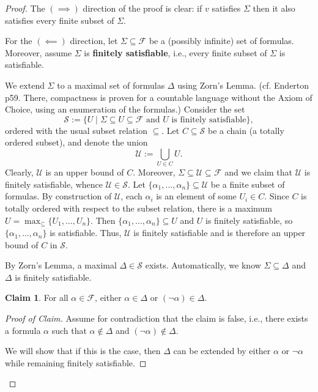 \documentclass[12pt]{article}
\theoremstyle{definition}
\newtheorem{claim}[theorem]{Claim}
\newcommand{\<}{\langle}
\renewcommand{\>}{\rangle}
\newcommand{\seq}{\subseteq}
\newcommand{\FF}{\mathcal{F}}
\renewcommand{\SS}{\mathcal{S}}
\newcommand{\UU}{\mathcal{U}}
\newcommand{\keyword}{\textbf}
\begin{document}
\begin{proof}
    The $(\implies)$ direction of the proof is clear: if $v$ satisfies $\Sigma$ then it also satisfies every finite subset of $\Sigma$.

    For the $(\impliedby)$ direction, let $\Sigma \seq \FF$ be a (possibly infinite) set of formulas.
    Moreover, assume $\Sigma$ is \keyword{finitely satisfiable}, i.e., every finite subset of $\Sigma$ is satisfiable.

    We extend $\Sigma$ to a maximal set of formulas $\Delta$ using Zorn's Lemma.
    (cf. Enderton p59. There, compactness is proven for a countable language without the Axiom of Choice, using an enumeration of the formulas.)
    Consider the set
    \[
        \SS := \{U \mid \Sigma \seq U \seq \FF \text{ and $U$ is finitely satisfiable}\},
    \]
    ordered with the usual subset relation $\seq$.
    Let $C \seq \SS$ be a chain (a totally ordered subset), and denote the union
    \[
        \UU := \bigcup_{U \in C} U.
    \]
    Clearly, $\UU$ is an upper bound of $C$.
    Moreover, $\Sigma \seq \UU \seq \FF$ and we claim that $\UU$ is finitely satisfiable, whence $\UU \in \SS$.
    Let $\{\alpha_1, \dots, \alpha_n\} \seq \UU$ be a finite subset of formulas.
    By construction of $\UU$, each $\alpha_i$ is an element of some $U_i \in C$.
    Since $C$ is totally ordered with respect to the subset relation, there is a maximum $U = \max_\seq\{U_1, \dots, U_n\}$.
    Then $\{\alpha_1, \dots, \alpha_n\} \seq U$ and $U$ is finitely satisfiable, so $\{\alpha_1, \dots, \alpha_n\}$ is satisfiable.
    Thus, $\UU$ is finitely satisfiable and is therefore an upper bound of $C$ in $\SS$.

    By Zorn's Lemma, a maximal $\Delta \in \SS$ exists.
    Automatically, we know $\Sigma \seq \Delta$ and $\Delta$ is finitely satisfiable.

    \begin{claim}\label{clm:delta-comp}
        For all $\alpha \in \FF$, either $\alpha \in \Delta$ or $(\lnot\alpha) \in \Delta$.
    \end{claim}

    \begin{proof}[Proof of Claim]
        Assume for contradiction that the claim is false, i.e., there exists a formula $\alpha$ such that $\alpha \notin \Delta$ and $(\lnot\alpha) \notin \Delta$.
        
        We will show that if this is the case, then $\Delta$ can be extended by either $\alpha$ or $\lnot\alpha$ while remaining finitely satisfiable.


\end{proof}
\end{proof}
\end{document}
